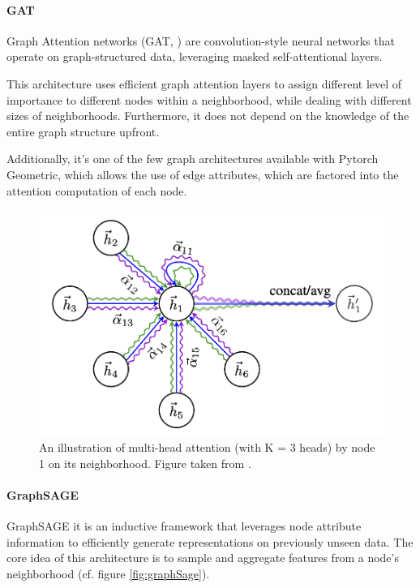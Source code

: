 \documentclass[final]{cvpr}
\begin{document}
\paragraph{GAT}

Graph Attention networks (GAT, \cite{GAT}) are convolution-style neural networks that operate on graph-structured data, leveraging masked self-attentional layers.

This architecture uses efficient graph attention layers to assign different level of importance to different nodes within a neighborhood, while dealing with different sizes of neighborhoods. Furthermore, it does not depend on the knowledge of the entire graph structure upfront.

Additionally, it's one of the few graph architectures available with Pytorch Geometric, which allows the use of edge attributes, which are factored into the attention computation of each node. 

\begin{figure}[h]
    \centering
    \includegraphics[width=0.8\columnwidth]{figures/attention.png}
    \caption{An illustration of multi-head attention (with K = 3 heads) by node 1 on its neighborhood. Figure taken from \cite{GAT}.}
    \label{fig:attention}
\end{figure}

\paragraph{GraphSAGE}

GraphSAGE \cite{graphsage} it is an inductive framework that leverages node attribute information to efficiently generate representations on previously unseen data. The core idea of this architecture is to sample and aggregate features from a node's neighborhood (cf. figure \ref{fig:graphSage}).
\end{document}
